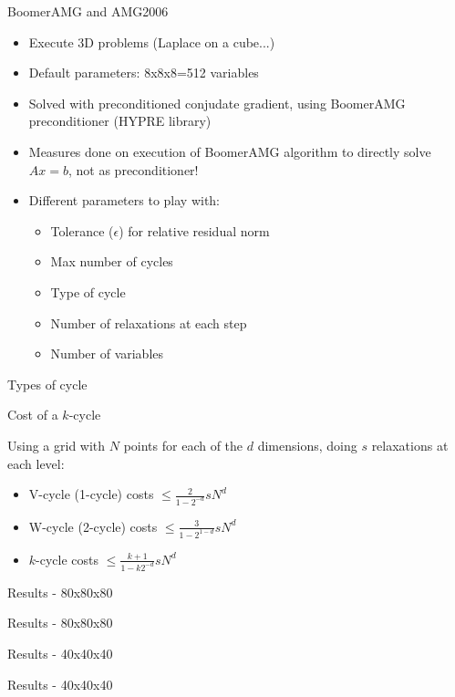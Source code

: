 \documentclass{beamer}
\begin{document}
\begin{frame}{BoomerAMG and AMG2006}
  
  \begin{itemize}
   \item Execute 3D problems (Laplace on a cube...)
   \item Default parameters: 8x8x8=512 variables
   \item Solved with preconditioned conjudate gradient, using BoomerAMG preconditioner (HYPRE library)
   \pause
   \item Measures done on execution of BoomerAMG algorithm to directly solve $Ax=b$, not as preconditioner!
   \item Different parameters to play with:
    \begin{itemize}
      \item Tolerance ($\epsilon$) for relative residual norm
      \item Max number of cycles
      \item Type of cycle
      \item Number of relaxations at each step
      \item Number of variables
    \end{itemize}
    
  \end{itemize}
 
\end{frame}

\begin{frame}{Types of cycle}
 
 
\end{frame}

\begin{frame}{Cost of a $k$-cycle}
 
 Using a grid with $N$ points for each of the $d$ dimensions, doing $s$ relaxations at each level:
 \begin{itemize}
  \item V-cycle (1-cycle) costs $\leq \frac{2}{1-2^{-d}} sN^d$
  \item W-cycle (2-cycle) costs $\leq \frac{3}{1-2^{1-d}} sN^d$
  \item $k$-cycle costs $\leq \frac{k+1}{1-k2^{-d}} sN^d$
 \end{itemize}
\end{frame}

\begin{frame}{Results - 80x80x80}
\end{frame}
\begin{frame}{Results - 80x80x80}
\end{frame}
\begin{frame}{Results - 40x40x40}
\end{frame}
\begin{frame}{Results - 40x40x40}
\end{frame}
\end{document}
